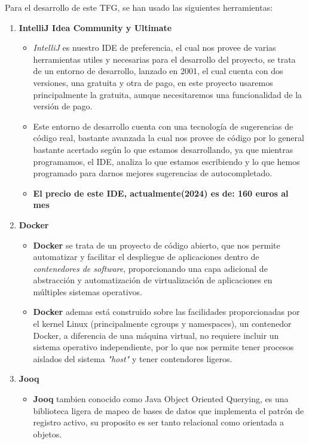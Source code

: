 \documentclass[a4paper]{article}
\begin{document}
Para el desarrollo de este TFG, se han usado las siguientes herramientas:
\begin{enumerate}
    \item \textbf{IntelliJ Idea Community y Ultimate}
          \begin{itemize}
              \item \textit{IntelliJ} es nuestro IDE de preferencia, el cual nos provee de varias herramientas utiles y necesarias para el desarrollo del proyecto, se trata de un entorno de desarrollo, lanzado en 2001, el cual cuenta con dos versiones, una gratuita y otra de pago, en este proyecto usaremos principalmente la gratuita, aunque necesitaremos una funcionalidad de la versión de pago.
              \item Este entorno de desarrollo cuenta con una tecnología de sugerencias de código real, bastante avanzada la cual nos provee de código por lo general bastante acertado según lo que estamos desarrollando, ya que mientras programamos, el IDE, analiza lo que estamos escribiendo y lo que hemos programado para darnos mejores sugerencias de autocompletado.
              \item \textbf{El precio de este IDE, actualmente(2024) es de: 160 euros al mes}
          \end{itemize}
    \item \textbf{Docker}
          \begin{itemize}
              \item \textbf{Docker} se trata de un proyecto de código abierto, que nos permite automatizar y facilitar el despliegue de aplicaciones dentro de \textit{contenedores de software}, proporcionando una capa adicional de abstracción y automatización de virtualización de aplicaciones en múltiples sistemas operativos.
              \item \textbf{Docker} ademas está construido sobre las facilidades proporcionadas por el kernel Linux (principalmente cgroups y namespaces), un contenedor Docker, a diferencia de una máquina virtual, no requiere incluir un sistema operativo independiente, por lo que nos permite tener procesos aislados del sistema \textit{"host"} y tener contendores ligeros.
          \end{itemize}
    \item \textbf{Jooq}
          \begin{itemize}
              \item \textbf{Jooq} tambien conocido como Java Object Oriented Querying, es una biblioteca ligera de mapeo de bases de datos que implementa el patrón de registro activo, su proposito es ser tanto relacional como orientada a objetos.

\end{itemize}
\end{enumerate}
\end{document}
